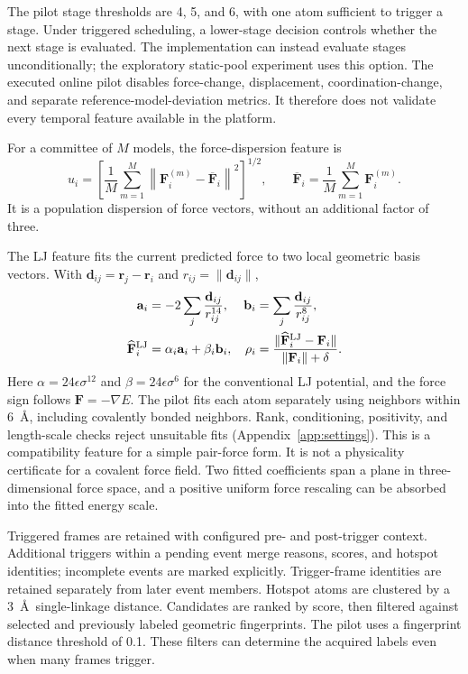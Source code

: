 The pilot stage thresholds are 4, 5, and 6, with one atom sufficient to
trigger a stage. Under triggered scheduling, a lower-stage decision
controls whether the next stage is evaluated. The implementation can instead
evaluate stages unconditionally; the exploratory static-pool experiment
uses this option. The executed online pilot disables force-change,
displacement, coordination-change, and separate reference-model-deviation
metrics. It therefore does not validate every temporal feature available
in the platform.

For a committee of $M$ models, the force-dispersion feature is
\begin{equation}
 u_i=\left[\frac{1}{M}\sum_{m=1}^{M}
 \left\|\mathbf{F}^{(m)}_i-\overline{\mathbf{F}}_i\right\|^2\right]^{1/2},
 \qquad
 \overline{\mathbf{F}}_i=\frac{1}{M}\sum_{m=1}^{M}\mathbf{F}^{(m)}_i .
 \label{eq:committee}
\end{equation}
It is a population dispersion of force vectors, without an additional
factor of three.

The LJ feature fits the current predicted force to two local geometric
basis vectors. With $\mathbf{d}_{ij}=\mathbf{r}_j-\mathbf{r}_i$ and
$r_{ij}=\|\mathbf{d}_{ij}\|$,
\begin{align}
 \mathbf{a}_i&=-2\sum_j\frac{\mathbf{d}_{ij}}{r_{ij}^{14}},
 & \mathbf{b}_i&=\sum_j\frac{\mathbf{d}_{ij}}{r_{ij}^{8}},\\
 \widehat{\mathbf{F}}^{\rm LJ}_i&=\alpha_i\mathbf{a}_i+\beta_i\mathbf{b}_i,
 & \rho_i&=\frac{\|\widehat{\mathbf{F}}^{\rm LJ}_i-\mathbf{F}_i\|}
 {\|\mathbf{F}_i\|+\delta}.
 \label{eq:lj}
\end{align}
Here $\alpha=24\epsilon\sigma^{12}$ and
$\beta=24\epsilon\sigma^6$ for the conventional LJ potential, and the force
sign follows $\mathbf{F}=-\nabla E$. The pilot fits each atom separately
using neighbors within 6~\AA, including covalently bonded neighbors.
Rank, conditioning, positivity, and length-scale checks reject unsuitable
fits (Appendix~\ref{app:settings}). This is a compatibility feature for a
simple pair-force form. It is not a physicality certificate for a covalent
force field. Two fitted coefficients span a plane in three-dimensional
force space, and a positive uniform force rescaling can be absorbed into
the fitted energy scale.

Triggered frames are retained with configured pre- and post-trigger
context. Additional triggers within a pending event merge reasons,
scores, and hotspot identities; incomplete events are marked explicitly.
Trigger-frame identities are retained separately from later event members.
Hotspot atoms are clustered by a 3~\AA\ single-linkage distance.
Candidates are ranked by score, then filtered against selected and
previously labeled geometric fingerprints. The pilot uses a fingerprint
distance threshold of 0.1. These filters can determine the acquired
labels even when many frames trigger.

